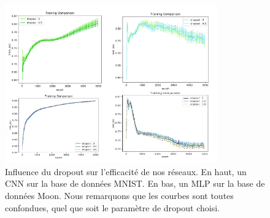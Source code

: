 \begin{figure}[!ht]
\centering
\includegraphics[width=260pt]{images/cnn/resultat_dropout.png}
\caption{Influence du dropout sur l'efficacité de nos réseaux. En haut, un CNN sur la base de données MNIST. En bas, un MLP sur la base de données Moon. Nous remarquons que les courbes sont toutes confondues, quel que soit le paramètre de dropout choisi.}
\label{resultat_dropout}
\end{figure}

 


